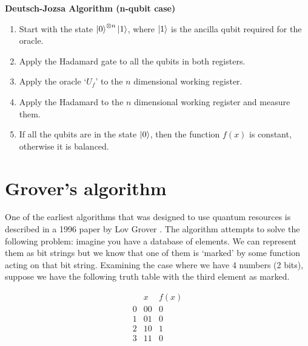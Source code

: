 \begin{tcolorbox}[standard jigsaw,
    opacityback=0,  %
    boxrule=0.5pt,label={Deutsch's algorithm box}]
    {\bf Deutsch-Jozsa Algorithm (n-qubit case)}
    \tcbline
    \begin{enumerate}
    \item Start with the state $\left\vert{0}\right\rangle^{\otimes n}\left\vert{1}\right\rangle$, where $\left\vert{1}\right\rangle$ is the ancilla qubit required for the oracle.
    \item Apply the Hadamard gate to all the qubits in both registers.
    \item Apply the oracle `$U_{f}$' to the $n$ dimensional working register.
    \item Apply the Hadamard to the $n$ dimensional working register and measure them.
    \item If all the qubits are in the state $\left\vert{0}\right\rangle$, then the function $f(x)$ is constant, otherwise it is balanced.
    \end{enumerate}
\end{tcolorbox}




\section{Grover's algorithm} \label{Grover-section}


One of the earliest algorithms that was designed to use quantum resources is described in a 1996 paper by Lov Grover \cite{Grover1996}. The algorithm attempts to solve the following problem: imagine you have a database of elements. We can represent them as bit strings but we know that one of them is `marked' by some function acting on that bit string. Examining the case where we have 4 numbers (2 bits), suppose we have the following truth table with the third element as marked. 

\begin{equation}
\begin{array}{c|c|c}
    & x & f(x) \\
    \hline
    0 & 00 & 0 \\
    1 & 01 & 0 \\
    2 & 10 & 1 \\
    3 & 11 & 0 \\
\end{array}
\end{equation}

